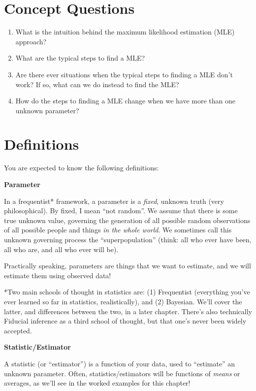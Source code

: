 \documentclass[
  letterpaper,
  DIV=11,
  numbers=noendperiod]{scrreprt}
\begin{document}
\section{Concept Questions}\label{concept-questions-1}

\begin{enumerate}
\def\labelenumi{\arabic{enumi}.}
\item
  What is the intuition behind the maximum likelihood estimation (MLE)
  approach?
\item
  What are the typical steps to find a MLE?
\item
  Are there ever situations when the typical steps to finding a MLE
  don't work? If so, what can we do instead to find the MLE?
\item
  How do the steps to finding a MLE change when we have more than one
  unknown parameter?
\end{enumerate}

\section{Definitions}\label{definitions-1}

You are expected to know the following definitions:

\textbf{Parameter}

In a frequentist* framework, a parameter is a \emph{fixed}, unknown
truth (very philosophical). By fixed, I mean ``not random''. We assume
that there is some true unknown value, governing the generation of all
possible random observations of all possible people and things \emph{in
the whole world}. We sometimes call this unknown governing process the
``superpopulation'' (think: all who ever have been, all who are, and all
who ever will be).

Practically speaking, parameters are things that we want to estimate,
and we will estimate them using observed data!

*Two main schools of thought in statistics are: (1) Frequentist
(everything you've ever learned so far in statistics, realistically),
and (2) Bayesian. We'll cover the latter, and differences between the
two, in a later chapter. There's also technically Fiducial inference as
a third school of thought, but that one's never been widely accepted.

\textbf{Statistic/Estimator}

A statistic (or ``estimator'') is a function of your data, used to
``estimate'' an unknown parameter. Often, statistics/estimators will be
functions of \emph{means} or averages, as we'll see in the worked
examples for this chapter!
\end{document}
